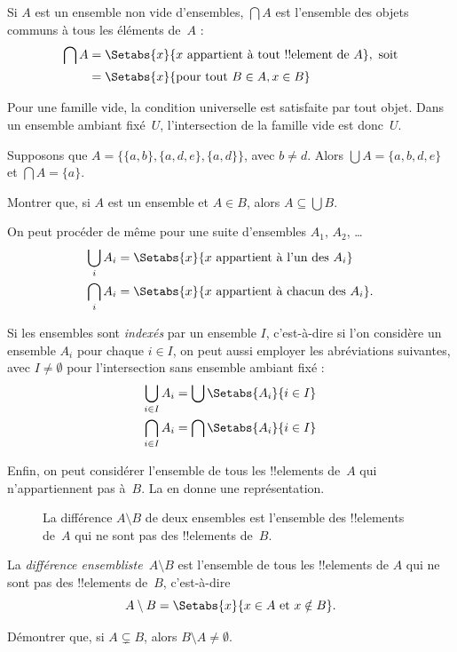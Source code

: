 \documentclass[../../../include/open-logic-section]{subfiles}
\begin{document}
\begin{defn}
Si $A$ est un ensemble non vide d'ensembles, $\bigcap A$ est
l'ensemble des objets communs à tous les éléments de~$A$ :
\begin{align*}
\bigcap A & = \Setabs{x}{x \text{ appartient à tout !!{element} de } A},
\text{ soit}\\
 & = \Setabs{x}{\text{pour tout } B \in A, x \in B}
\end{align*}
\end{defn}
Pour une famille vide, la condition universelle est satisfaite par
tout objet. Dans un ensemble ambiant fixé~$U$, l'intersection de
la famille vide est donc~$U$.
%
%

\begin{ex}
Supposons que $A = \{ \{ a, b \}, \{ a, d, e \}, \{ a, d \} \}$,
avec $b\neq d$.
Alors $\bigcup A = \{ a, b, d, e \}$ et $\bigcap A = \{ a \}$.
%
%
\end{ex}
\begin{prob}
	Montrer que, si $A$ est un ensemble et $A \in B$,
	alors $A \subseteq \bigcup B$.
\end{prob}

On peut procéder de même pour une suite d'ensembles
$A_1$, $A_2$, \dots
\begin{align*}
\bigcup_i A_i & = \Setabs{x}{x \text{ appartient à l'un des } A_i}\\
\bigcap_i A_i & = \Setabs{x}{x \text{ appartient à chacun des } A_i}.
\end{align*}

Si les ensembles sont \emph{indexés} par un ensemble $I$,
c'est-à-dire si l'on considère un ensemble $A_i$ pour chaque
$i \in I$, on peut aussi employer les abréviations suivantes,
avec $I\neq\emptyset$ pour l'intersection sans ensemble ambiant fixé :
\begin{align*}
	\bigcup_{i \in I} A_i & = \bigcup \Setabs{A_i }{i \in I}\\
	\bigcap_{i \in I} A_i & = \bigcap\Setabs{A_i}{i \in I}
\end{align*}

Enfin, on peut considérer l'ensemble de tous les !!{element}s
de~$A$ qui n'appartiennent pas à~$B$. La 
en donne une représentation.

\begin{figure}
  \caption{La différence $A \setminus B$ de deux ensembles
    est l'ensemble des !!{element}s de~$A$ qui ne sont pas
    des !!{element}s de~$B$.}
\end{figure}

\begin{defn}[Différence]
La \emph{différence ensembliste}~$A \setminus B$ est l'ensemble
de tous les !!{element}s de $A$ qui ne sont pas des !!{element}s
de~$B$, c'est-à-dire
\[
A\setminus B = \Setabs{x}{x\in A \text{ et } x \notin B}.
\]
\end{defn}

\begin{prob}
	Démontrer que, si $A \subsetneq B$,
	alors $B \setminus A \neq \emptyset$.
\end{prob}
\end{document}
